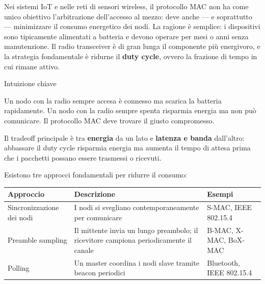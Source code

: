 \documentclass[
  italian,
  openany]{book}
\newcounter{none} %
\begin{document}
Nei sistemi IoT e nelle reti di sensori wireless, il protocollo MAC non
ha come unico obiettivo l'arbitrazione dell'accesso al mezzo: deve anche
--- e soprattutto --- minimizzare il consumo energetico dei nodi. La
ragione è semplice: i dispositivi sono tipicamente alimentati a batteria
e devono operare per mesi o anni senza manutenzione. Il radio
transceiver è di gran lunga il componente più energivoro, e la strategia
fondamentale è ridurne il \textbf{duty cycle}, ovvero la frazione di
tempo in cui rimane attivo.

\begin{callouttip}{Intuizione chiave}

Un nodo con la radio sempre accesa è connesso ma scarica la batteria
rapidamente. Un nodo con la radio sempre spenta risparmia energia ma non
può comunicare. Il protocollo MAC deve trovare il giusto compromesso.

\end{callouttip}

Il tradeoff principale è tra \textbf{energia} da un lato e
\textbf{latenza e banda} dall'altro: abbassare il duty cycle risparmia
energia ma aumenta il tempo di attesa prima che i pacchetti possano
essere trasmessi o ricevuti.

Esistono tre approcci fondamentali per ridurre il consumo:

{\def\LTcaptype{none} %
\begin{longtable}[]{@{}
  >{\raggedright\arraybackslash}p{}
  >{\raggedright\arraybackslash}p{}
  >{\raggedright\arraybackslash}p{}@{}}
\toprule\noalign{}
\begin{minipage}[b]{\linewidth}\raggedright
Approccio
\end{minipage} & \begin{minipage}[b]{\linewidth}\raggedright
Descrizione
\end{minipage} & \begin{minipage}[b]{\linewidth}\raggedright
Esempi
\end{minipage} \\
\midrule\noalign{}
\endhead
\bottomrule\noalign{}
\endlastfoot
Sincronizzazione dei nodi & I nodi si svegliano contemporaneamente per
comunicare & S-MAC, IEEE 802.15.4 \\
Preamble sampling & Il mittente invia un lungo preambolo; il ricevitore
campiona periodicamente il canale & B-MAC, X-MAC, BoX-MAC \\
Polling & Un master coordina i nodi slave tramite beacon periodici &
Bluetooth, IEEE 802.15.4 \\
\end{longtable}
}
\end{document}
